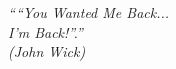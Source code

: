 \begin{epigrafe}
    \vspace*{\fill}
	\begin{flushright}
		\textit{``“You Wanted Me Back...\\I’m Back!”.'' \\
		(John Wick)}
	\end{flushright}
\end{epigrafe}

